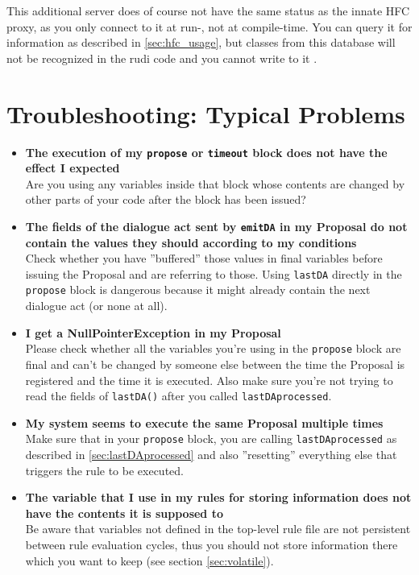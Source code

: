 This additional server does of course not have the same status as the innate HFC proxy, as you only connect to it at run-, not at compile-time. You can query it for information as described in \ref{sec:hfc_usage}, but classes from this database will not be recognized in the rudi code and you cannot write to it .
\fi

\section{Troubleshooting: Typical Problems}

\begin{itemize}

\item \textbf{The execution of my \texttt{propose} or \texttt{timeout} block does not have the effect I expected}\\
  Are you using any variables inside that block whose contents are
  changed by other parts of your code after the block has been issued?

\item \textbf{The fields of the dialogue act sent by \texttt{emitDA} in my Proposal do not contain the values they should according to my conditions}\\
  Check whether you have ''buffered'' those values in final variables
  before issuing the Proposal and are referring to those. Using
  \texttt{lastDA} directly in the \texttt{propose} block is dangerous
  because it might already contain the next dialogue act (or none at
  all).

\item \textbf{I get a NullPointerException in my Proposal}\\
  Please check whether all the variables you're using in the
  \texttt{propose} block are final and can't be changed by someone
  else between the time the Proposal is registered and the time it is
  executed. Also make sure you're not trying to read the fields of
  \texttt{lastDA()} after you called \texttt{lastDAprocessed}.

\item \textbf{My system seems to execute the same Proposal multiple times}\\
  Make sure that in your \texttt{propose} block, you are calling
  \texttt{lastDAprocessed} as described in \ref{sec:lastDAprocessed}
  and also ''resetting'' everything else that triggers the rule to be
  executed.

\item \textbf{The variable that I use in my rules for storing information does not have the contents it is supposed to}\\
  Be aware that variables not defined in the top-level rule file are
  not persistent between rule evaluation cycles, thus you should not
  store information there which you want to keep (see section
  \ref{sec:volatile}).


\end{itemize}
